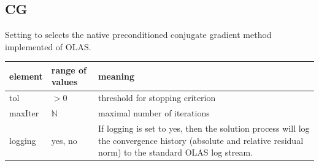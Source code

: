 \subsection{CG}
Setting  to  selects the native preconditioned
conjugate
gradient method implemented of OLAS.
%
%
\begin{center}
\begin{tabular}{llp{}}
\toprule
element & range of values & meaning \\
\midrule
tol     & $> 0$        & threshold for stopping criterion\\
\midrule
maxIter & $\mathbb{N}$ & maximal number of iterations\\
\midrule
logging & yes, no & If logging is set to yes, then the solution process will
	            log the convergence history (absolute and relative residual
                    norm) to the standard OLAS log stream.\\
\bottomrule
\end{tabular}
\end{center}
%
%
